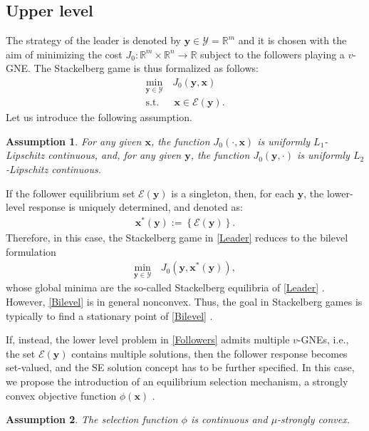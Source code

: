 \documentclass[letterpaper, 10 pt, conference]{ieeeconf}
\newcommand{\real}{\mathbb{R}}
\newcommand\xbf{\mathbf{x}}
\newcommand\ybf{\mathbf{y}}
\newtheorem{assumption}{Assumption}
\begin{document}
\subsection{Upper level}
The strategy of the leader is denoted by $\ybf \in \mathcal{Y}=\real^m$ and it is chosen with the aim of minimizing the cost $J_0: \real^m \times \real^n\rightarrow \real$ subject to the followers playing a $v$-GNE. The Stackelberg game is thus formalized as follows: 
\begin{equation}\label{Leader}
\begin{aligned}
\underset{\ybf \in \mathcal{Y}} {\min} \, &J_0(\ybf, \xbf)
\\
\mathrm{s.t.} \,& \, \xbf \in \mathcal{E}(\ybf). 
\end{aligned}
\end{equation}
Let us introduce the following assumption. 
\begin{assumption}\label{Ass4}
    For any given $\xbf$, the function $J_0(\cdot,\xbf)$ is uniformly $L_1$-Lipschitz continuous, and, for any given $\ybf$, the function $J_0(\ybf,\cdot)$ is uniformly $L_2$-Lipschitz continuous.
\end{assumption}
If the follower equilibrium set $\mathcal{E}(\ybf)$ is a singleton, then, for each $\ybf$, the lower-level response is uniquely determined, and denoted as:
\begin{align*}
    \xbf^*(\ybf):=\left\{\mathcal{E}(\ybf)\right\}.
\end{align*}
Therefore, in this case, the Stackelberg game in \eqref{Leader} reduces to the bilevel formulation 
\begin{align}\label{Bilevel}
\underset{\ybf \in \mathcal{Y}} {\min} \, &J_0(\ybf, \xbf^*(\ybf)), 
\end{align}
whose global minima are the so-called Stackelberg equilibria of \eqref{Leader} \cite{dempe2002foundations}. However, \eqref{Bilevel} is in general nonconvex. Thus, the goal in Stackelberg games is typically to find a stationary point of \eqref{Bilevel} \cite{maheshwari2024follower, grontas2024big}.


If, instead, the lower level problem in \eqref{Followers} admits multiple $v$-GNEs, i.e., the set $\mathcal{E}(\ybf)$ contains multiple solutions, then the follower response becomes set-valued, and the SE solution concept has to be further specified. In this case, we propose the introduction of an equilibrium selection mechanism, a strongly convex objective function $\phi(\xbf)$ \cite{benenatix2023optimal}. 
\begin{assumption}\label{StronglyConvex}
    The selection function $\phi$ is continuous and $\mu$-strongly convex.
\end{assumption}
\end{document}
